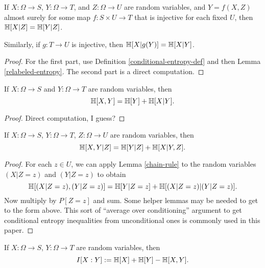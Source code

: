 \begin{lemma}\label{relabeled-entropy-cond}
  If $X: \Omega \to S$, $Y: \Omega \to T$, and $Z: \Omega \to U$ are random variables, and $Y = f(X,Z)$ almost surely for some map $f: S \times U \to T$ that is injective for each fixed $U$, then $\mathbb{H}[X|Z] = \mathbb{H}[Y|Z]$.

  Similarly, if $g: T \to U$ is injective, then $\mathbb{H}[X|g(Y)] = \mathbb{H}[X|Y]$.
\end{lemma}

\begin{proof}
  For the first part, use Definition \ref{conditional-entropy-def} and then Lemma \ref{relabeled-entropy}.  The second part is a direct computation.
\end{proof}


\begin{lemma}\label{chain-rule}
  \leanok
  If $X: \Omega \to S$ and $Y: \Omega \to T$ are random variables, then
  $$ \mathbb{H}[X, Y] = \mathbb{H}[Y] + \mathbb{H}[X|Y].$$
  \end{lemma}
  \begin{proof}
  \leanok
  Direct computation, I guess?
\end{proof}

\begin{lemma}\label{conditional-chain-rule}
  If $X: \Omega \to S$, $Y: \Omega \to T$, $Z: \Omega \to U$ are random variables, then
$$ \mathbb{H}[X, Y | Z ] = \mathbb{H}[Y | Z] + \mathbb{H}[X|Y, Z].$$
\end{lemma}

\begin{proof}   For each $z \in U$, we can apply Lemma \ref{chain-rule} to the random variables $(X|Z=z)$ and $(Y|Z=z)$ to obtain
  $$ \mathbb{H}[ (X|Z=z),(Y|Z=z) ] = \mathbb{H}[Y|Z=z] + \mathbb{H}[(X|Z=z)|(Y|Z=z)].$$
  Now multiply by $P[Z=z]$ and sum.  Some helper lemmas may be needed to get to the form above.  This sort of ``average over conditioning'' argument to get conditional entropy inequalities from unconditional ones is commonly used in this paper.
\end{proof}

\begin{definition}
  \label{information-def}
  \leanok
  If $X: \Omega \to S$, $Y: \Omega \to T$ are random variables, then
  $$I[X : Y] := \mathbb{H}[X] + \mathbb{H}[Y] - \mathbb{H}[X,Y].$$
\end{definition}

